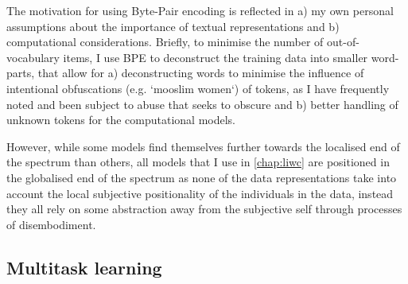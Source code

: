 The motivation for using Byte-Pair encoding is reflected in a) my own personal assumptions about the importance of textual representations and b) computational considerations. Briefly, to minimise the number of out-of-vocabulary items, I use BPE to deconstruct the training data into smaller word-parts, that allow for a) deconstructing words to minimise the influence of intentional obfuscations (e.g. `mooslim women`) of tokens, as I have frequently noted and been subject to abuse that seeks to obscure  and b) better handling of unknown tokens for the computational models.

However, while some models find themselves further towards the localised end of the spectrum than others, all models that I use in \autoref{chap:liwc} are positioned in the globalised end of the spectrum as none of the data representations take into account the local subjective positionality of the individuals in the data, instead they all rely on some abstraction away from the subjective self through processes of disembodiment.

\subsection{Multitask learning}\label{sub:mtl}

